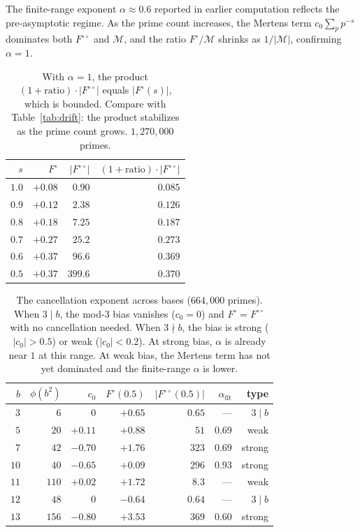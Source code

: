 \documentclass[12pt]{amsart}
\theoremstyle{definition}
\theoremstyle{remark}
\begin{document}
The finite-range exponent $\alpha \approx 0.6$ reported
in earlier computation reflects the pre-asymptotic
regime. As the prime count increases, the Mertens term
$c_0 \sum_p p^{-s}$ dominates both $F^{\circ\circ}$
and $\mathcal{M}$, and the ratio
$F^{\circ}/\mathcal{M}$ shrinks as $1/|\mathcal{M}|$,
confirming $\alpha = 1$.

\begin{table}[h]
\centering
\begin{tabular}{rrrr}
\toprule
$s$ & $F^{\circ}$ & $|F^{\circ\circ}|$ &
$(1{+}\text{ratio}) \cdot |F^{\circ\circ}|$ \\
\midrule
$1.0$ & $+0.08$ & $0.90$ & $0.085$ \\
$0.9$ & $+0.12$ & $2.38$ & $0.126$ \\
$0.8$ & $+0.18$ & $7.25$ & $0.187$ \\
$0.7$ & $+0.27$ & $25.2$ & $0.273$ \\
$0.6$ & $+0.37$ & $96.6$ & $0.369$ \\
$0.5$ & $+0.37$ & $399.6$ & $0.370$ \\
\bottomrule
\end{tabular}
\caption{With $\alpha = 1$, the product
$(1{+}\text{ratio}) \cdot |F^{\circ\circ}|$ equals
$|F^{\circ}(s)|$, which is bounded. Compare with
Table~\ref{tab:drift}: the product stabilizes as
the prime count grows. $1{,}270{,}000$ primes.}
\label{tab:alpha-one}
\end{table}

\begin{table}[h]
\centering
\begin{tabular}{rrrrrrr}
\toprule
$b$ & $\phi(b^2)$ & $c_0$ & $F^{\circ}(0.5)$ &
$|F^{\circ\circ}(0.5)|$ & $\alpha_{\text{fit}}$ &
type \\
\midrule
$3$ & $6$ & $0$ & $+0.65$ & $0.65$ & --- & $3 \mid b$ \\
$5$ & $20$ & $+0.11$ & $+0.88$ & $51$ & $0.69$ &
weak \\
$7$ & $42$ & $-0.70$ & $+1.76$ & $323$ & $0.69$ &
strong \\
$10$ & $40$ & $-0.65$ & $+0.09$ & $296$ & $0.93$ &
strong \\
$11$ & $110$ & $+0.02$ & $+1.72$ & $8.3$ & --- &
weak \\
$12$ & $48$ & $0$ & $-0.64$ & $0.64$ & --- & $3 \mid b$ \\
$13$ & $156$ & $-0.80$ & $+3.53$ & $369$ & $0.60$ &
strong \\
\bottomrule
\end{tabular}
\caption{The cancellation exponent across bases
($664{,}000$ primes). When $3 \mid b$, the mod-$3$
bias vanishes ($c_0 = 0$) and $F^{\circ} = F^{\circ\circ}$
with no cancellation needed. When $3 \nmid b$, the
bias is strong ($|c_0| > 0.5$) or weak ($|c_0| < 0.2$).
At strong bias, $\alpha$ is already near $1$ at this
range. At weak bias, the Mertens term has not yet
dominated and the finite-range $\alpha$ is lower.}
\label{tab:multi-base}
\end{table}
\end{document}
